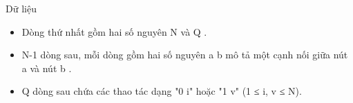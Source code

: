 Dữ liệu
\begin{itemize}
	\item Dòng thứ nhất gồm hai số nguyên N và Q .
	\item N-1 dòng sau, mỗi dòng gồm hai số nguyên a b mô tả một cạnh nối giữa nút a và nút b .
	\item Q dòng sau chứa các thao tác dạng "0 i" hoặc "1 v" (1 ≤ i, v ≤ N).
\end{itemize}